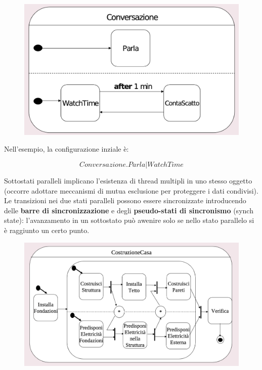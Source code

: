 \begin{figure}[h!]
    \centering
    \includegraphics[width=0.75\linewidth]{assets/UML/state/state8.png}
\end{figure}

Nell'esempio, la configurazione inziale è:

$$Conversazione.Parla|WatchTime$$ 

Sottostati paralleli implicano l'esistenza di thread multipli in uno stesso oggetto (occorre adottare meccanismi di mutua esclusione per proteggere i dati condivisi).\\
Le transizioni nei due stati paralleli possono essere sincronizzate introducendo delle \textbf{barre di sincronizzazione} e degli \textbf{pseudo-stati di sincronismo} (synch state): l'avanzamento in un sottostato può awenire solo se nello stato parallelo si è raggiunto un certo punto.

\begin{figure}[h!]
    \centering
    \includegraphics[width=0.75\linewidth]{assets/UML/state/state9.png}
\end{figure}

\newpage